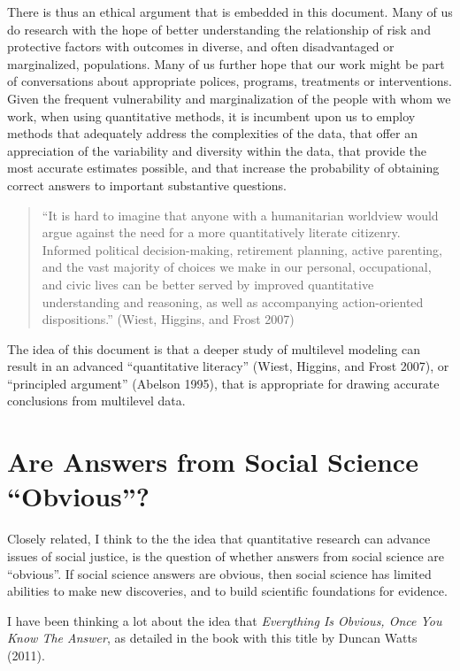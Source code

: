 \documentclass[
  letterpaper,
  DIV=11,
  numbers=noendperiod]{scrreprt}
\begin{document}
There is thus an ethical argument that is embedded in this document.
Many of us do research with the hope of better understanding the
relationship of risk and protective factors with outcomes in diverse,
and often disadvantaged or marginalized, populations. Many of us further
hope that our work might be part of conversations about appropriate
polices, programs, treatments or interventions. Given the frequent
vulnerability and marginalization of the people with whom we work, when
using quantitative methods, it is incumbent upon us to employ methods
that adequately address the complexities of the data, that offer an
appreciation of the variability and diversity within the data, that
provide the most accurate estimates possible, and that increase the
probability of obtaining correct answers to important substantive
questions.

\begin{quote}
``It is hard to imagine that anyone with a humanitarian worldview would
argue against the need for a more quantitatively literate citizenry.
Informed political decision-making, retirement planning, active
parenting, and the vast majority of choices we make in our personal,
occupational, and civic lives can be better served by improved
quantitative understanding and reasoning, as well as accompanying
action-oriented dispositions.'' (Wiest, Higgins, and Frost 2007)
\end{quote}

The idea of this document is that a deeper study of multilevel modeling
can result in an advanced ``quantitative literacy'' (Wiest, Higgins, and
Frost 2007), or ``principled argument'' (Abelson 1995), that is
appropriate for drawing accurate conclusions from multilevel data.

\hypertarget{are-answers-from-social-science-obvious}{%
\section{Are Answers from Social Science
``Obvious''?}\label{are-answers-from-social-science-obvious}}

Closely related, I think to the the idea that quantitative research can
advance issues of social justice, is the question of whether answers
from social science are ``obvious''. If social science answers are
obvious, then social science has limited abilities to make new
discoveries, and to build scientific foundations for evidence.

I have been thinking a lot about the idea that \emph{Everything Is
Obvious, Once You Know The Answer}, as detailed in the book with this
title by Duncan Watts (2011).
\end{document}
